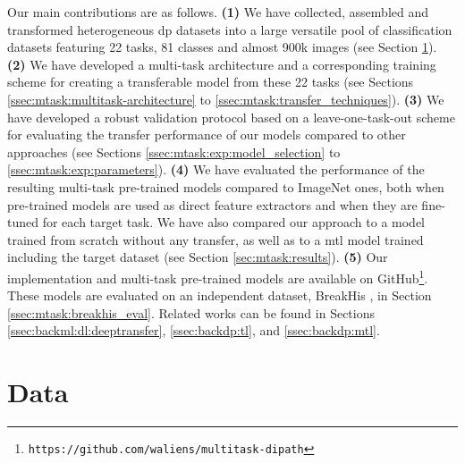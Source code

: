 Our main contributions are as follows. \textbf{(1)} We have collected, assembled and transformed heterogeneous \acrlong{dp} datasets into a large versatile pool of classification datasets featuring 22 tasks, 81 classes and almost 900k images (see Section \ref{sec:mtask:data}). \textbf{(2)} We have developed a multi-task architecture and a corresponding training scheme for creating a transferable model from these 22 tasks (see Sections \ref{ssec:mtask:multitask-architecture} to \ref{ssec:mtask:transfer_techniques}). \textbf{(3)} We have developed a robust validation protocol based on a leave-one-task-out scheme for evaluating the transfer performance of our models compared to other approaches (see Sections \ref{ssec:mtask:exp:model_selection} to \ref{ssec:mtask:exp:parameters}). \textbf{(4)} We have evaluated the performance of the resulting multi-task pre-trained models compared to ImageNet ones, both when pre-trained models are used as direct feature extractors and when they are fine-tuned for each target task. We have also compared our approach to a model trained from scratch without any transfer, as well as to a \acrshort{mtl} model trained including the target dataset (see Section \ref{sec:mtask:results}). \textbf{(5)} Our implementation and multi-task pre-trained models are available on GitHub\footnote{\texttt{https://github.com/waliens/multitask-dipath}}. These models are evaluated on an independent dataset, BreakHis \cite{spanhol2015dataset}, in Section \ref{ssec:mtask:breakhis_eval}. Related works can be found in Sections \ref{ssec:backml:dl:deeptransfer}, \ref{ssec:backdp:tl}, and \ref{ssec:backdp:mtl}.  

\section{Data}
\label{sec:mtask:data}


